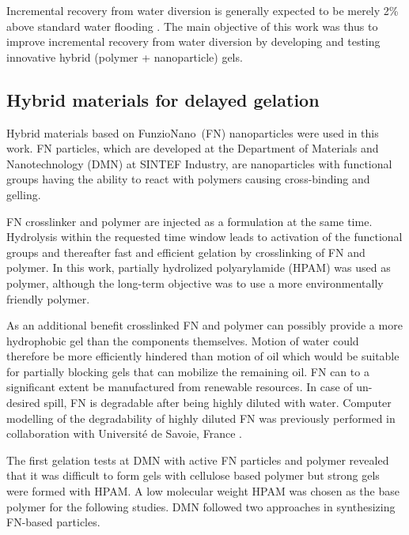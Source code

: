 \documentclass[nanomaterials,article,submit,moreauthors,pdftex]{Definitions/mdpi}
\begin{document}
Incremental recovery from water diversion is generally expected to be merely 2\% above standard water flooding \citep{OG21}. The main objective of this work was thus to improve incremental recovery from water diversion by developing and testing innovative hybrid (polymer + nanoparticle) gels.

\subsection{Hybrid materials for delayed gelation}
Hybrid materials based on FunzioNano\texttrademark~(FN) nanoparticles were used in this work. FN particles, which are developed at  the  Department  of  Materials  and  Nanotechnology (DMN) at  SINTEF  Industry, are nanoparticles with functional groups having the ability to react with polymers causing cross-binding and gelling. 

FN crosslinker and polymer are injected as a formulation at the same time. Hydrolysis within the requested time window leads to activation of the functional groups and thereafter fast and efficient gelation by crosslinking of FN and polymer. In this work, partially hydrolized polyarylamide (HPAM) was used as polymer, although the long-term objective was to use a more environmentally friendly polymer.  

As an additional benefit crosslinked FN and polymer can possibly provide a more hydrophobic gel than the components themselves. Motion of water could therefore be more efficiently hindered than motion of oil which would be suitable for partially blocking gels that can mobilize the remaining oil. FN can to a significant extent be manufactured from renewable resources. In case of un-desired spill, FN is degradable after being highly diluted with water. Computer modelling of the degradability of highly diluted FN was previously performed in collaboration with Université de Savoie, France \citep{Neyertz2012,Neyertz2013}.

The first gelation tests at DMN with active FN particles and polymer revealed that it was difficult to form gels with cellulose based polymer but strong gels were formed with HPAM. A low molecular weight HPAM was chosen as the base polymer for the following studies. DMN followed two approaches in synthesizing FN-based particles. 
    
\end{document}
